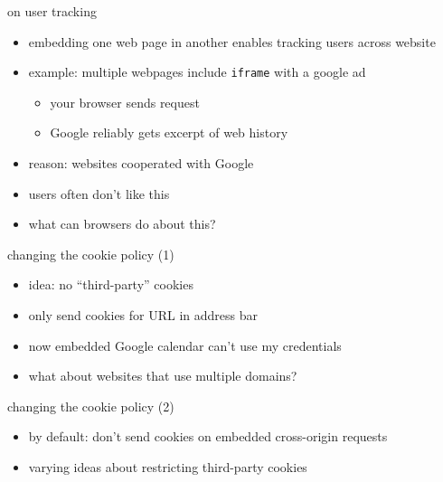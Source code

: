 \begin{frame}{on user tracking}
    \begin{itemize}
    \item embedding one web page in another enables tracking users across website
    \item example: multiple webpages include \texttt{iframe} with a google ad
        \begin{itemize}
        \item your browser sends request 
        \item Google reliably gets excerpt of web history
        \end{itemize}
    \item reason: websites cooperated with Google
    \item users often don't like this
    \item what can browsers do about this?
    \end{itemize}
\end{frame}

\begin{frame}{changing the cookie policy (1)}
    \begin{itemize}
    \item idea: no ``third-party'' cookies
    \item only send cookies for URL in address bar
    \vspace{.5cm}
    \item<2> now embedded Google calendar can't use my credentials
    \item<2> what about websites that use multiple domains?
    \end{itemize}
\end{frame}

\begin{frame}{changing the cookie policy (2)}
    \begin{itemize}
    \item by default: don't send cookies on embedded cross-origin requests
    \item varying ideas about restricting third-party cookies
    \end{itemize}
\end{frame}

